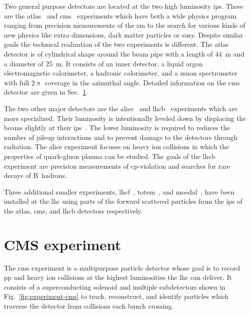 Two general purpose detectors are located at the two high luminosity \glspl{ip}. These are the \gls{atlas}~\cite{Aad:2008zzm} and \gls{cms}~\cite{Chatrchyan:2008aa} experiments which have both a wide physics program ranging from precision measurements of the \gls{sm} to the search for various kinds of new physics like extra dimensions, dark matter particles or \gls{susy}. Despite similar goals the technical realization of the two experiments is different. The \gls{atlas} detector is of cylindrical shape around the beam pipe with a length of 44~m and a diameter of 25~m. It consists of an inner detector, a liquid argon electromagnetic calorimeter, a hadronic calorimeter, and a muon spectrometer with full $2\uppi$ coverage in the azimuthal angle. %
Detailed information on the \gls{cms} detector are given in Sec.~\ref{sec:experiment-cms}.

The two other major detectors are the \gls{alice}~\cite{Aamodt:2008zz} and \gls{lhcb}~\cite{Alves:2008zz} experiments which are more specialized. Their luminosity is intentionally leveled down by displacing the beams slightly at their \glspl{ip}~\cite{Follin:1955354}. The lower luminosity is required to reduces the number of pileup interactions and to prevent damage to the detectors through radiation. The \gls{alice} experiment focuses on heavy ion collisions in which the properties of quark-gluon plasma can be studied. The goals of the \gls{lhcb} experiment are precision measurements of \gls{cp}-violation and searches for rare decays of B~hadrons.

Three additional smaller experiments, \gls{lhcf}~\cite{Adriani:2008zz}, \gls{totem}~\cite{Anelli:2008zza}, and \gls{moedal}~\cite{Pinfold:2009oia}, have been installed at the \gls{lhc} using parts of the forward scattered particles from the \glspl{ip} of the \gls{atlas}, \gls{cms}, and \gls{lhcb} detectors respectively. 


\section{CMS experiment}
\label{sec:experiment-cms}

The \gls{cms} experiment is a multipurpose particle detector whose goal is to record pp and heavy ion collisions at the highest luminosities the \gls{lhc} can deliver. It consists of a superconducting solenoid and multiple subdetectors shown in Fig.~\ref{fig:experiment-cms} to track, reconstruct, and identify particles which traverse the detector from collisions each bunch crossing.

